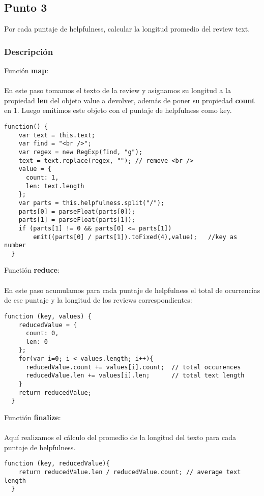 \subsection{Punto 3}

Por cada puntaje de helpfulness, calcular la longitud promedio del review text.

\subsubsection{Descripción}

Función \textbf{map}:\\\\
En este paso tomamos el texto de la review y asignamos su longitud a la propiedad \textbf{len} del objeto value a devolver, además de poner su propiedad \textbf{count} en 1. Luego emitimos este objeto con el puntaje de helpfulness como key.

\begin{lstlisting}[frame=leftline]
  function() {
    var text = this.text;
    var find = "<br />";
    var regex = new RegExp(find, "g");
    text = text.replace(regex, ""); // remove <br />
    value = { 
      count: 1, 
      len: text.length 
    };
    var parts = this.helpfulness.split("/");
	parts[0] = parseFloat(parts[0]);
	parts[1] = parseFloat(parts[1]);
	if (parts[1] != 0 && parts[0] <= parts[1])
		emit((parts[0] / parts[1]).toFixed(4),value);	//key as number
  }
\end{lstlisting}

Functión \textbf{reduce}:\\\\
En este paso acumulamos para cada puntaje de helpfulness el total de ocurrencias de ese puntaje y la longitud de los reviews correspondientes:

\begin{lstlisting}[frame=leftline]
  function (key, values) {
    reducedValue = { 
      count: 0, 
      len: 0 
    }; 
    for(var i=0; i < values.length; i++){
      reducedValue.count += values[i].count;  // total occurences
      reducedValue.len += values[i].len;      // total text length
    }
    return reducedValue;
  }
\end{lstlisting}

Functión \textbf{finalize}:\\\\
Aquí realizamos el cálculo del promedio de la longitud del texto para cada puntaje de helpfulness.

\begin{lstlisting}[frame=leftline]
  function (key, reducedValue){
    return reducedValue.len / reducedValue.count; // average text length
  }
\end{lstlisting}

